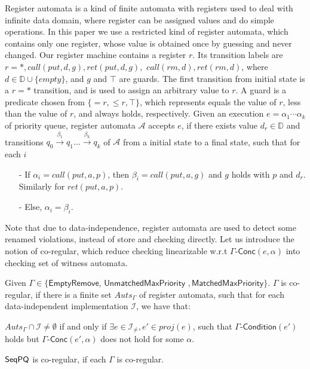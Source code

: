 Register automata is a kind of finite automata with registers used to deal with infinite data domain, where register can be assigned values and do simple operations. In this paper we use a restricted kind of register automata, which contains only one register, whose value is obtained once by guessing and never changed. Our register machine contains a register $r$. Its transition labels are $r=*,\textit{call}(\textit{put},d,g), \textit{ret}(\textit{put},d,g),$ $\textit{call}(\textit{rm},d),\textit{ret}(\textit{rm},d)$, where $d \in \mathbb{D} \cup \{ \textit{empty} \}$, and $g$ and $\top$ are guards. The first transition from initial state is a $r=*$ transition, and is used to assign an arbitrary value to $r$. A guard is a predicate chosen from $\{=r,\leq r,\top \}$, which represents equals the value of $r$, less than the value of $r$, and always holds, respectively. Given an execution $e = \alpha_1 \cdots \alpha_k$ of priority queue, register automata $\mathcal{A}$ accepts $e$, if there exists value $d_r\in \mathbb{D}$ and transitions $q_0 \xrightarrow{\beta_1} q_1 \ldots \xrightarrow{\beta_k} q_k$ of $\mathcal{A}$ from a initial state to a final state, such that for each $i$

\begin{itemize}
\setlength{\itemsep}{0.5pt}
\item[-] If $\alpha_i = \textit{call}(\textit{put},a,p)$, then $\beta_i= \textit{call}(\textit{put},a,g)$ and $g$ holds with $p$ and $d_r$. Similarly for $\textit{ret}(\textit{put},a,p)$.

\item[-] Else, $\alpha_i = \beta_i$.
\end{itemize}

Note that due to data-independence, register automata are used to detect some renamed violations, instead of store and checking directly. Let us introduce the notion of co-regular, which reduce checking linearizable w.r.t $\Gamma\mathsf{\text{-}Conc}(e,\alpha)$ into checking set of witness automata.

\begin{definition}\label{def:co-regular of rules of extended priority queues}
Given $\Gamma\in \{\mathsf{EmptyRemove}$, $\mathsf{UnmatchedMaxPriority}$ $,\mathsf{MatchedMaxPriority}\}$. $\Gamma$ is co-regular, if there is a finite set $\textit{Auts}_{\Gamma}$ of register automata, such that for each data-independent implementation $\mathcal{I}$, we have that:

$\textit{Auts}_{\Gamma} \cap \mathcal{I} \neq \emptyset$ if and only if $\exists e \in \mathcal{I}_{\neq},e' \in \textit{proj}(e)$, such that $\Gamma\mathsf{\text{-}Condition}(e')$ holds but $\Gamma\mathsf{\text{-}Conc}(e',\alpha)$ does not hold for some $\alpha$.

$\mathsf{SeqPQ}$ is co-regular, if each $\Gamma$ is co-regular.
\end{definition}

